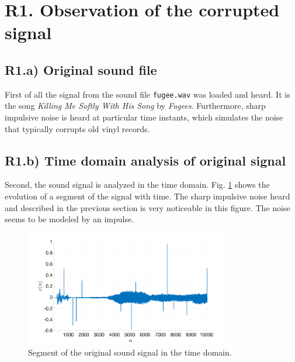 \documentclass[a4paper, oneside, 11pt]{article}
\begin{document}
\newpage
{}
\setcounter{page}{1}


\section{R1. Observation of the corrupted signal}\label{sec:R1}

\subsection{R1.a) Original sound file}
First of all the signal from the sound file \texttt{fugee.wav} was loaded and heard. It is the song \textit{Killing Me Softly With His Song} by \textit{Fugees}. Furthermore, sharp impulsive noise is heard at particular time instants, which simulates the noise that typically corrupts old vinyl records.

\subsection{R1.b) Time domain analysis of original signal}
Second, the sound signal is analyzed in the time domain. Fig. \ref{fig:R1b} shows the evolution of a segment of the signal with time. The sharp impulsive noise heard and described in the previous section is very noticeable in this figure. The noise seems to be modeled by an impulse.
\begin{figure}[htbp]
	\centering
	\includegraphics[width= 0.8\textwidth]{figures/R1b.png}
	\caption{Segment of the original sound signal in the time domain.}
	\label{fig:R1b}
\end{figure}
\end{document}
